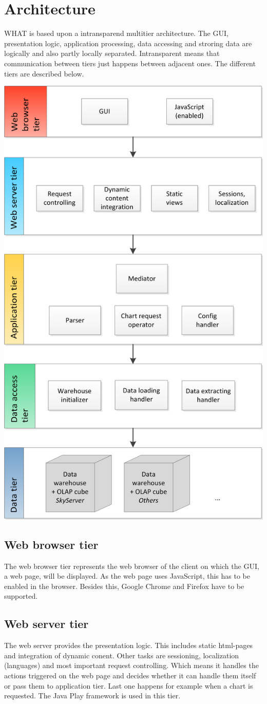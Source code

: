 \section{Architecture}

WHAT is based upon a intransparend multitier architecture. 
The GUI, presentation logic, application processing, data accessing and stroring data
are logically and also partly locally separated. Intransparent means that communication
between tiers just happens between adjacent ones. The different tiers are described below.


\begin{center}
\includegraphics[width=0.6\linewidth]{Pictures/TierArchi.png} 
\end{center}   


\subsection{Web browser tier}
The web browser tier represents the web browser of the client on which the GUI, a web page, will be displayed.
As the web page uses JavaScript, this has to be enabled in the browser. 
Besides this, Google Chrome and Firefox have to be supported. 


\subsection{Web server tier}
The web server provides the presentation logic. This includes static html-pages and integration of dynamic
conent. Other tasks are sessioning, localization (languages) and most important request controlling. 
Which means it handles the actions triggered on the web page and decides whether it can handle them itself 
or pass them to application tier. Last one happens for example when a chart is requested. 
The Java Play framework is used in this tier.


